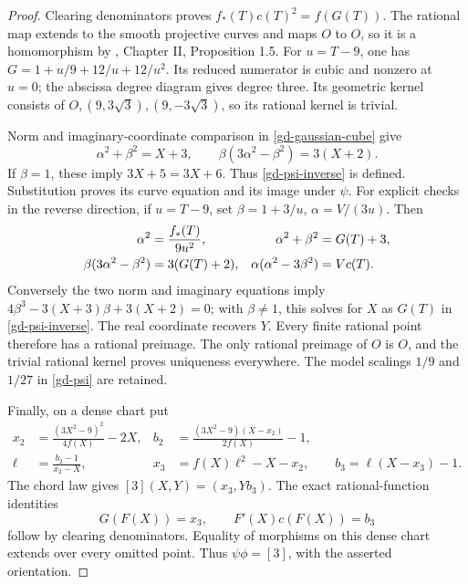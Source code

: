 \begin{proof}
Clearing denominators proves \(f_*(T)c(T)^2=f(G(T))\).
The rational map extends to the smooth projective curves and maps
\(O\) to \(O\), so it is a homomorphism by
\cite{MilneEC2Descent}, Chapter II, Proposition 1.5.
For \(u=T-9\), one has \(G=1+u/9+12/u+12/u^2\).
Its reduced numerator is cubic and nonzero at \(u=0\); the abscissa
degree diagram gives degree three. Its geometric kernel consists of
\(O,(9,3\sqrt3),(9,-3\sqrt3)\), so its rational kernel is trivial.

Norm and imaginary-coordinate comparison in
\eqref{gd-gaussian-cube} give
\[
 \alpha^2+\beta^2=X+3,\qquad
 \beta(3\alpha^2-\beta^2)=3(X+2).
\]
If \(\beta=1\), these imply \(3X+5=3X+6\).
Thus \eqref{gd-psi-inverse} is defined. Substitution proves its
curve equation and its image under \(\psi\).
For explicit checks in the reverse direction, if \(u=T-9\), set
\(\beta=1+3/u\), \(\alpha=V/(3u)\). Then
\begin{align}
 \alpha^2&=\frac{f_*(T)}{9u^2},
 &\alpha^2+\beta^2&=G(T)+3,\label{gd-gaussian-inverse-identities}\\
 \beta(3\alpha^2-\beta^2)&=3(G(T)+2),
 &\alpha(\alpha^2-3\beta^2)&=Vc(T).\notag
\end{align}
Conversely the two norm and imaginary equations imply
\(4\beta^3-3(X+3)\beta+3(X+2)=0\); with \(\beta\ne1\), this
solves for \(X\) as \(G(T)\) in \eqref{gd-psi-inverse}.
The real coordinate recovers \(Y\).
Every finite rational point therefore has a rational preimage.
The only rational preimage of \(O\) is \(O\), and the trivial
rational kernel proves uniqueness everywhere. The model scalings
\(1/9\) and \(1/27\) in \eqref{gd-psi} are retained.

Finally, on a dense chart put
\begin{align*}
 x_2&=\frac{(3X^2-9)^2}{4f(X)}-2X,&
 b_2&=\frac{(3X^2-9)(X-x_2)}{2f(X)}-1,\\
 \ell&=\frac{b_2-1}{x_2-X},&
 x_3&=f(X)\ell^2-X-x_2,\qquad
 b_3=\ell(X-x_3)-1.
\end{align*}
The chord law gives \([3](X,Y)=(x_3,Yb_3)\).
The exact rational-function identities
\begin{equation}\label{gd-composition}
 G(F(X))=x_3,\qquad F'(X)c(F(X))=b_3
\end{equation}
follow by clearing denominators. Equality of morphisms on this dense
chart extends over every omitted point. Thus \(\psi\phi=[3]\),
with the asserted orientation.
\end{proof}

